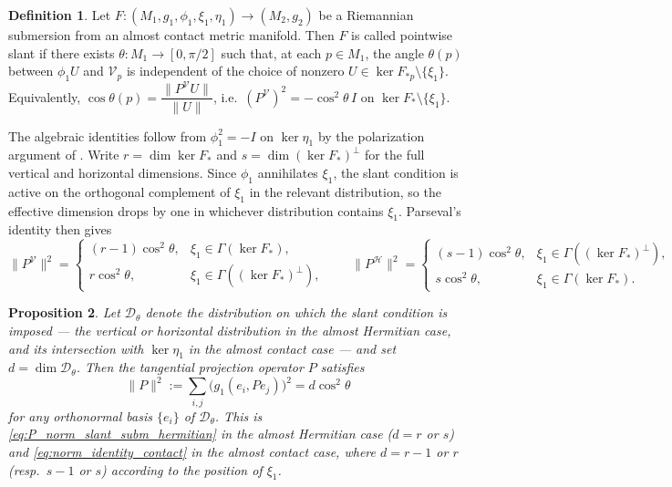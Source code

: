 \documentclass[11pt]{amsart}
\theoremstyle{plain}
\newtheorem{proposition}{Proposition}[section]
\theoremstyle{definition}
\newtheorem{definition}[proposition]{Definition}
\theoremstyle{remark}
\begin{document}
\begin{definition}\cite{Kumar2020,Prasad2021,LeeSahin2014}
Let $F:(M_1,g_1,\phi_1,\xi_1,\eta_1)\to(M_2,g_2)$ be a Riemannian
submersion from an almost contact metric manifold. Then $F$ is called
pointwise slant if
there exists $\theta:M_1\to[0,\pi/2]$ such that, at each $p\in M_1$,
the angle $\theta(p)$ between $\phi_1 U$ and $\mathcal{V}_p$ is
independent of the choice of nonzero
$U\in\ker F_{*p}\setminus\{\xi_1\}$. Equivalently,
$\cos\theta(p)=\dfrac{\|P^{\mathcal{V}}U\|}{\|U\|}$, i.e.\
$(P^{\mathcal{V}})^2=-\cos^2\theta\,I$ on $\ker F_*\setminus\{\xi_1\}$.

\end{definition}


The algebraic identities follow from $\phi_1^2=-I$ on $\ker\eta_1$
by the polarization argument of \cite[Lemma~2.2]{Park2015}. Write
$r=\dim\ker F_*$ and $s=\dim(\ker F_*)^{\perp}$ for the full vertical
and horizontal dimensions. Since $\phi_1$ annihilates $\xi_1$, the slant
condition is active on the orthogonal complement of $\xi_1$ in the
relevant distribution, so the effective dimension drops by one in
whichever distribution contains $\xi_1$. Parseval's identity then gives
\begin{equation}\label{eq:norm_identity_contact}
  \|P^{\mathcal{V}}\|^2 =
  \begin{cases}
    (r-1)\cos^2\theta, & \xi_1\in\Gamma(\ker F_*),\\[2pt]
    r\cos^2\theta, & \xi_1\in\Gamma((\ker F_*)^{\perp}),
  \end{cases}
  \qquad
  \|P^{\mathcal{H}}\|^2 =
  \begin{cases}
    (s-1)\cos^2\theta, & \xi_1\in\Gamma((\ker F_*)^{\perp}),\\[2pt]
    s\cos^2\theta, & \xi_1\in\Gamma(\ker F_*).
  \end{cases}
\end{equation}

\begin{proposition}\label{prop:key_slant_identities}
Let $\mathcal{D}_\theta$ denote the distribution on which the slant
condition is imposed --- the vertical or horizontal distribution in the
almost Hermitian case, and its intersection with $\ker\eta_1$ in the
almost contact case --- and set $d=\dim\mathcal{D}_\theta$. Then the
tangential projection operator $P$ satisfies
\begin{equation}\label{eq:norm_P}
  \|P\|^2 := \sum_{i,j}\bigl(g_1(e_i,Pe_j)\bigr)^2 = d\cos^2\theta
\end{equation}
for any orthonormal basis $\{e_i\}$ of $\mathcal{D}_\theta$. This is
\eqref{eq:P_norm_slant_subm_hermitian} in the almost Hermitian case
($d=r$ or $s$) and \eqref{eq:norm_identity_contact} in the almost
contact case, where $d=r-1$ or $r$ (resp.\ $s-1$ or $s$) according to the
position of $\xi_1$.
\end{proposition}
\end{document}
